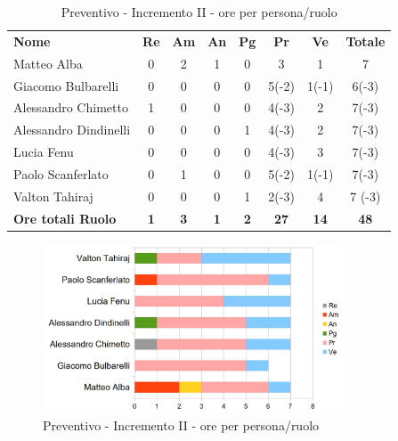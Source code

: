 \begin{table} [h!]
	\begin{center}
		\begin{tabular} { m{3.5cm} c c c c c c c }
			\rowcolor{lightgray}
			\textbf{Nome} & \textbf{Re} & \textbf{Am} & \textbf{An} & \textbf{Pg} & \textbf{Pr} & \textbf{Ve} & \textbf{Totale} \\
			Matteo Alba & 0 & 2 & 1 & 0 & 3 & 1 & 7 \\
			Giacomo Bulbarelli & 0 & 0 & 0 & 0 & 5(-2) & 1(-1) & 6(-3) \\
			Alessandro Chimetto & 1 & 0 & 0 & 0 & 4(-3) & 2 & 7(-3) \\
			Alessandro Dindinelli & 0 & 0 & 0 & 1 & 4(-3) & 2 & 7(-3) \\
			Lucia Fenu & 0 & 0 & 0 & 0 & 4(-3) & 3 & 7(-3) \\
			Paolo Scanferlato & 0 & 1 & 0 & 0 & 5(-2) & 1(-1) & 7(-3) \\
			Valton Tahiraj & 0 & 0 & 0 & 1 & 2(-3) & 4 & 7 (-3)\\
			\textbf{Ore totali Ruolo} & \textbf{1} & \textbf{3} & \textbf{1} & \textbf{2} & \textbf{27}& \textbf{14} & \textbf{48}
		\end{tabular}
		\caption{Preventivo - Incremento II - ore per persona/ruolo}
	\end{center}
\end{table}
\begin{figure} [h!]
	\centering
	\includegraphics[width=0.8\textwidth]{res/img/grafici/Incremento2Ore.jpg}
	\caption{Preventivo - Incremento II - ore per persona/ruolo} 
\end{figure}

\newpage

